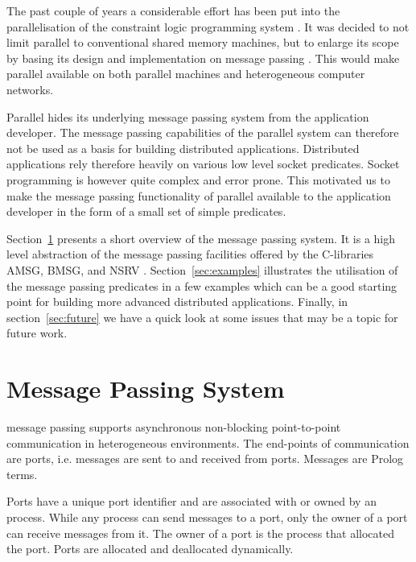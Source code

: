 The past couple of years a considerable effort has been put into
the parallelisation of the \eclipse constraint logic programming
system \cite{eclipse:iclp94}. It was decided to not limit parallel 
\eclipse to conventional shared memory machines, but to enlarge its 
scope by basing its design and implementation on message passing 
\cite{ecn_9404}. This would make parallel \eclipse available on 
both parallel machines and heterogeneous computer networks.

Parallel \eclipse hides its underlying message passing system from
the \eclipse application developer. The message passing capabilities
of the parallel \eclipse system can therefore not be used as a basis for 
building distributed applications. Distributed \eclipse applications 
rely therefore heavily on various low level socket predicates. Socket 
programming is however quite complex and error prone. This motivated us to make 
the message passing functionality of parallel \eclipse available to 
the \eclipse application developer in the form of a small set of simple 
predicates.     

Section~\ref{sec:mps} presents a short overview of the \eclipse 
message passing system. It is a high level abstraction of the 
message passing facilities offered by the C-libraries AMSG, BMSG, 
and NSRV \cite{bmsgref,amsgref,nsrvref}. Section~\ref{sec:examples}
illustrates the utilisation of the \eclipse message passing
predicates in a few examples which can
be a good starting point for building more advanced distributed
\eclipse applications. Finally, in section~\ref{sec:future} we have 
a quick look at some issues that may be a topic for future work.



\section{\eclipse Message Passing System}
\label{sec:mps}

\eclipse message passing supports asynchronous non-blocking 
point-to-point communication in heterogeneous environments. The 
end-points of communication are ports, i.e. messages are sent to and 
received from ports. Messages are Prolog terms. 

Ports have a unique port identifier and are associated with or owned 
by an \eclipse process. While any \eclipse process can send messages 
to a port, only the owner of a port can receive messages from it. The 
owner of a port is the \eclipse process that allocated the port. Ports 
are allocated and deallocated dynamically. 

